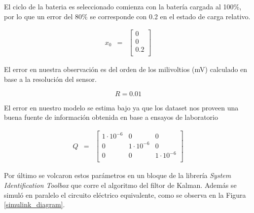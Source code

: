 \documentclass[10pt,a4paper]{article}
\begin{document}
\noindent El ciclo de la bateria es seleccionado comienza con la batería cargada
al 100\%, por lo que un error del 80\% se corresponde con 0.2 en el estado de
carga relativo.

\begin{equation}
    \begin{array}{llll}
	x_0 & = & \begin{bmatrix}
	    0 \\
	    0 \\
	    0.2 \\
	\end{bmatrix} 
    \end{array} \nonumber
\end{equation}

\noindent El error en nuestra observación es del orden de los milivoltios
(mV) calculado en base a la resolución del sensor.

\begin{equation}
    R = 0.01  \nonumber
\end{equation}

\noindent El error en nuestro modelo se estima bajo ya que los dataset nos 
proveen una buena fuente de información obtenida en base a ensayos de 
laboratorio

\begin{equation}
    \begin{array}{llll}
	Q & = & \begin{bmatrix}
	    1\cdot10^{-6} & 0 & 0 \\
	    0 & 1\cdot10^{-6} & 0 \\
	    0 & 0 & 1\cdot10^{-6} \\
	\end{bmatrix} 
    \end{array} \nonumber
\end{equation}

Por último se volcaron estos parámetros en un bloque de la librería \emph{System
Identification Toolbox} que corre el algoritmo del filtor de Kalman. Además se
simuló en paralelo el circuito eléctrico equivalente, como se observa en la
Figura \ref{simulink_diagram}.
\end{document}
